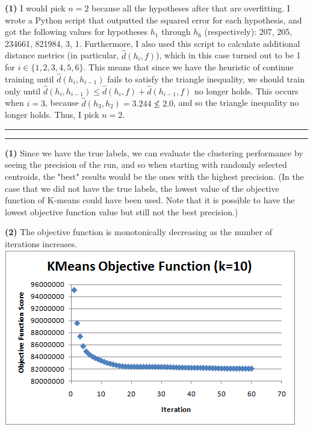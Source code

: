 \documentclass[11pt]{article}
\newcommand{\question}[2] {\vspace{.25in} \hrule\vspace{0.5em}
\noindent{\bf #1: #2} \vspace{0.5em}
\hrule \vspace{.10in}}
\renewcommand{\part}[1] {\vspace{.10in} {\bf (#1)}}
\begin{document}
\part{1}
I would pick $n=2$ because all the hypotheses after that are overfitting. I wrote a Python script that outputted the squared error for each hypothesis, and got the following values for hypotheses $h_1$ through $h_6$ (respectively): 207, 205, 234661, 821984, 3, 1. Furthermore, I also used this script to calculate additional distance metrics (in particular, $\hat{d}(h_i, f)$), which in this case turned out to be 1 for $i \in \{1, 2, 3, 4, 5, 6\}$. This means that since we have the heuristic of continue training until $\hat{d}(h_i, h_{i-1})$ fails to satisfy the triangle inequality, we should train only until $\hat{d}(h_i, h_{i-1}) \leq \hat{d}(h_i, f) + \hat{d}(h_{i-1}, f)$ no longer holds. This occurs when $i=3$, because $\hat{d}(h_3, h_2) = 3.244 \not \leq 2.0$, and so the triangle inequality no longer holds. Thus, I pick $n=2$.

\question{4}{Programming: K-Means}
\part{1}
Since we have the true labels, we can evaluate the clustering performance by seeing the precision of the run, and so when starting with randomly selected centroids, the "best" results would be the ones with the highest precision. (In the case that we did not have the true labels, the lowest value of the objective function of K-means could have been used. Note that it is possible to have the lowest objective function value but still not the best precision.)

\part{2}
The objective function is monotonically decreasing as the number of iterations increases.\\
\includegraphics{q4b.png}\\
\end{document}
